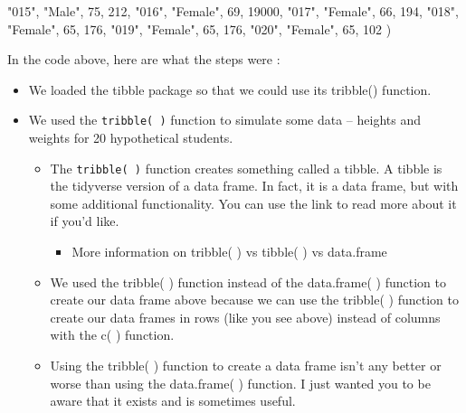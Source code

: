 \documentclass[
  letterpaper,
  DIV=11,
  numbers=noendperiod]{scrreprt}
\newenvironment{Shaded}{\begin{snugshade}}{\end{snugshade}}
\newcommand{\DecValTok}[1]{\textcolor[rgb]{0.68,0.00,0.00}{#1}}
\newcommand{\NormalTok}[1]{\textcolor[rgb]{0.00,0.23,0.31}{#1}}
\newcommand{\StringTok}[1]{\textcolor[rgb]{0.13,0.47,0.30}{#1}}
\providecommand{\tightlist}{%
  \setlength{\itemsep}{0pt}\setlength{\parskip}{0pt}}\usepackage{longtable,booktabs,array}
\begin{document}
\begin{Shaded}
\begin{Highlighting}[]
  \StringTok{"015"}\NormalTok{, }\StringTok{"Male"}\NormalTok{,   }\DecValTok{75}\NormalTok{,     }\DecValTok{212}\NormalTok{,}
  \StringTok{"016"}\NormalTok{, }\StringTok{"Female"}\NormalTok{, }\DecValTok{69}\NormalTok{,     }\DecValTok{19000}\NormalTok{,}
  \StringTok{"017"}\NormalTok{, }\StringTok{"Female"}\NormalTok{, }\DecValTok{66}\NormalTok{,     }\DecValTok{194}\NormalTok{,}
  \StringTok{"018"}\NormalTok{, }\StringTok{"Female"}\NormalTok{, }\DecValTok{65}\NormalTok{,     }\DecValTok{176}\NormalTok{,}
  \StringTok{"019"}\NormalTok{, }\StringTok{"Female"}\NormalTok{, }\DecValTok{65}\NormalTok{,     }\DecValTok{176}\NormalTok{,}
  \StringTok{"020"}\NormalTok{, }\StringTok{"Female"}\NormalTok{, }\DecValTok{65}\NormalTok{,     }\DecValTok{102}
\NormalTok{)}
\end{Highlighting}
\end{Shaded}

In the code above, here are what the steps were :

\begin{itemize}
\item
  We loaded the tibble package so that we could use its tribble()
  function.
\item
  We used the \texttt{tribble(\ )} function to simulate some data --
  heights and weights for 20 hypothetical students.

  \begin{itemize}
  \item
    The \texttt{tribble(\ )} function creates something called a tibble.
    A tibble is the tidyverse version of a data frame. In fact, it is a
    data frame, but with some additional functionality. You can use the
    link to read more about it if you'd like.

    \begin{itemize}
    \tightlist
    \item
      More information on tribble( ) vs tibble( ) vs data.frame
    \end{itemize}
  \item
    We used the tribble( ) function instead of the data.frame( )
    function to create our data frame above because we can use the
    tribble( ) function to create our data frames in rows (like you see
    above) instead of columns with the c( ) function.
  \item
    Using the tribble( ) function to create a data frame isn't any
    better or worse than using the data.frame( ) function. I just wanted
    you to be aware that it exists and is sometimes useful.
  \end{itemize}
\end{itemize}
\end{document}
